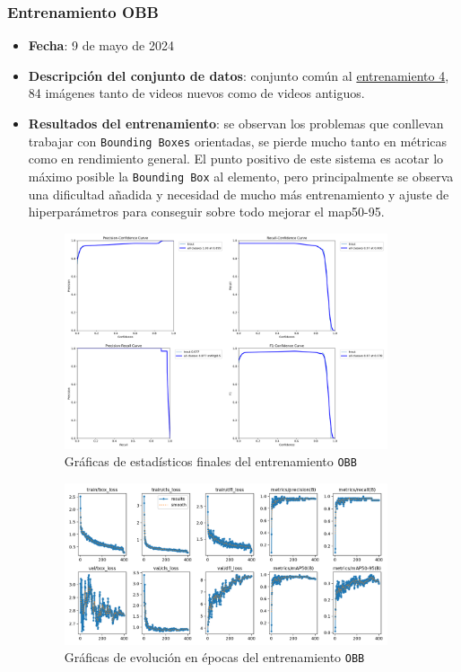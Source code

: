 \subsubsection*{Entrenamiento OBB}
\label{OBB:1}
\begin{itemize}
    \item \textbf{Fecha}: 9 de mayo de 2024
    \item \textbf{Descripción del conjunto de datos}: conjunto común al \hyperref[train:4]{entrenamiento 4}, 84 imágenes tanto de videos nuevos como de videos antiguos.
    \item \textbf{Resultados del entrenamiento}: se observan los problemas que conllevan trabajar con \texttt{Bounding Boxes} orientadas, se pierde mucho tanto en métricas como en rendimiento general. 
    El punto positivo de este sistema es acotar lo máximo posible la \texttt{Bounding Box} al elemento, pero principalmente se observa una dificultad añadida y necesidad de mucho más entrenamiento y 
    ajuste de hiperparámetros para conseguir sobre todo mejorar el \acrshort{map}50-95.

    \begin{figure}[H]
        \centering
        \includegraphics[width=0.9\textwidth]{images/13/b/obb/graficas2.png}
        \caption{Gráficas de estadísticos finales del entrenamiento \texttt{OBB}}
        \label{fig:EstadisticosOBB}
    \end{figure}
    \begin{figure}[H]
        \centering
        \includegraphics[width=0.9\textwidth]{images/13/b/obb/results.png}
        \caption{Gráficas de evolución en épocas del entrenamiento \texttt{OBB}}
        \label{fig:ResultadosOBB}
    \end{figure}

\end{itemize}
\clearpage
